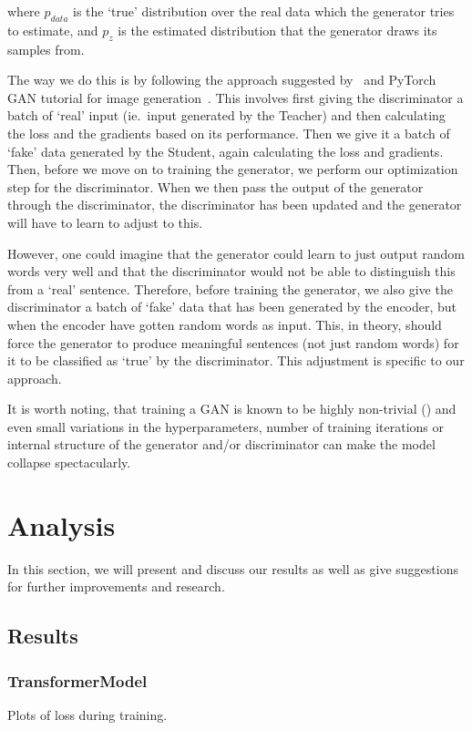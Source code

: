 \documentclass{article}
\begin{document}
where $p_{data}$ is the `true' distribution over the real data which the
generator tries to estimate, and $p_z$ is the estimated distribution that the
generator draws its samples from.

The way we do this is by following the approach suggested
by~\cite{Goodfellow2014GenerativeAN} and PyTorch GAN tutorial for image
generation~\cite{pytorchTutorialGAN}. This involves first giving the
discriminator a batch of `real' input (ie.\ input generated by the Teacher) and
then calculating the loss and the gradients based on its performance. Then we
give it a batch of `fake' data generated by the Student, again calculating the
loss and gradients. Then, before we move on to training the generator, we
perform our optimization step for the discriminator. When we then pass the
output of the generator through the discriminator, the discriminator has been
updated and the generator will have to learn to adjust to this. 

However, one could imagine that the generator could learn to just output random
words very well and that the discriminator would not be able to distinguish this
from a `real' sentence. Therefore, before training the generator, we also give
the discriminator a batch of `fake' data that has been generated by the encoder,
but when the encoder have gotten random words as input. This, in theory, should
force the generator to produce meaningful sentences (not just random words) for
it to be classified as `true' by the discriminator. This adjustment is specific to
our approach.

It is worth noting, that training a GAN is known to be highly non-trivial
(\cite{Hui2018}) and even small variations in the hyperparameters, number of training
iterations or internal structure of the generator and/or discriminator can make
the model collapse spectacularly.

\section{Analysis}\label{sec:analysis}

In this section, we will present and discuss our results as well as give
suggestions for further improvements and research.

\subsection{Results}\label{sec:results}

\subsubsection{TransformerModel}
Plots of loss during training.
\end{document}
